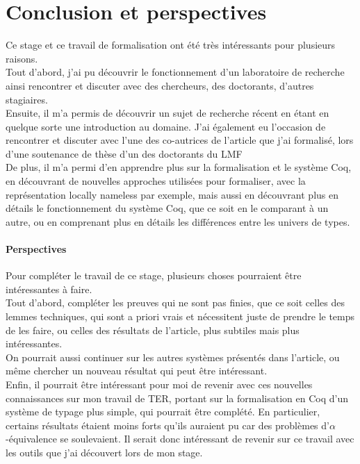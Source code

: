 \documentclass[10pt]{article}
\begin{document}
\section{Conclusion et perspectives}
Ce stage et ce travail de formalisation ont été très intéressants pour plusieurs raisons. \\ 
Tout d'abord, j'ai pu découvrir le fonctionnement d'un laboratoire de recherche ainsi rencontrer et discuter avec des chercheurs, des doctorants, d'autres stagiaires. \\
Ensuite, il m'a permis de découvrir un sujet de recherche récent en étant en quelque sorte une introduction au domaine. J'ai également eu l'occasion de rencontrer et discuter avec l'une des co-autrices de l'article que j'ai formalisé, lors d'une soutenance de thèse d'un des doctorants du LMF \\
De plus, il m'a permi d'en apprendre plus sur la formalisation et le système Coq, en découvrant de nouvelles approches utilisées pour formaliser, avec la représentation locally nameless par exemple, mais aussi en découvrant plus en détails le fonctionnement du système Coq, que ce soit en le comparant à un autre, ou en comprenant plus en détails les différences entre les univers de types.

\paragraph{Perspectives} Pour compléter le travail de ce stage, plusieurs choses pourraient être intéressantes à faire. \\ 
Tout d'abord, compléter les preuves qui ne sont pas finies, que ce soit celles des lemmes techniques, qui sont a priori vrais et nécessitent juste de prendre le temps de les faire, ou celles des résultats de l'article, plus subtiles mais plus intéressantes. \\
On pourrait aussi continuer sur les autres systèmes présentés dans l'article, ou même chercher un nouveau résultat qui peut être intéressant. \\
Enfin, il pourrait être intéressant pour moi de revenir avec ces nouvelles connaissances sur mon travail de TER, portant sur la formalisation en Coq d'un système de typage plus simple, qui pourrait être complété. En particulier, certains résultats étaient moins forts qu'ils auraient pu car des problèmes d'$\alpha$-équivalence se soulevaient. Il serait donc intéressant de revenir sur ce travail avec les outils que j'ai découvert lors de mon stage.
\end{document}
